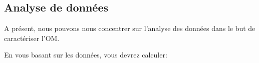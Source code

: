 \subsection{Analyse de donn\'ees}
A présent, nous pouvons nous concentrer sur l'analyse des donn\'ees dans le but de caractériser l'OM.

En vous basant sur les données, vous devrez calculer:
\begin{center}
\end{center}

